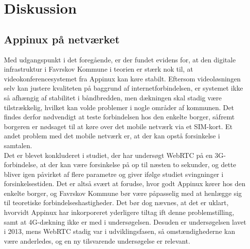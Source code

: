 \section{Diskussion}
\subsection{Appinux på netværket}
Med udgangspunkt i det foregående, er der fundet evidens for, at den digitale infrastruktur i Favrskov Kommune i teorien er stærk nok til, at videokonferencesystemet fra Appinux kan køre stabilt. Eftersom videoløsningen selv kan justere kvaliteten på baggrund af internetforbindelsen, er systemet ikke så afhængig af stabilitet i båndbredden, men dækningen skal stadig være tilstrækkelig, hvilket kan volde problemer i nogle områder af kommunen. Det findes derfor nødvendigt at teste forbindelsen hos den enkelte borger, såfremt borgeren er nødsaget til at køre over det mobile netværk via et SIM-kort. Et andet problem med det mobile netværk er, at der kan opstå forsinkelse i samtalen.\\
Det er blevet konkluderet i studiet\cite{webrtcjournal}, der har undersøgt WebRTC på en 3G-forbindelse, at der kan være forsinkelse på op til næsten to sekunder, og dette bliver igen påvirket af flere parametre og giver ifølge studiet svingninger i forsinkelsestiden. Det er altså svært at forudse, hvor godt Appinux kører hos den enkelte borger, og Favrskov Kommune bør være påpasselig med at henlægge sig til teoretiske forbindelseshastigheder. Det bør dog nævnes, at det er uklart, hvorvidt Appinux har inkorporeret yderligere tiltag ift denne problemstilling, samt at 4G-dækning ikke er med i undersøgelsen. Desuden er undersøgelsen lavet i 2013, mens WebRTC stadig var i udviklingsfasen, så omstændighederne kan være anderledes, og en ny tilsvarende undersøgelse er relevant.
